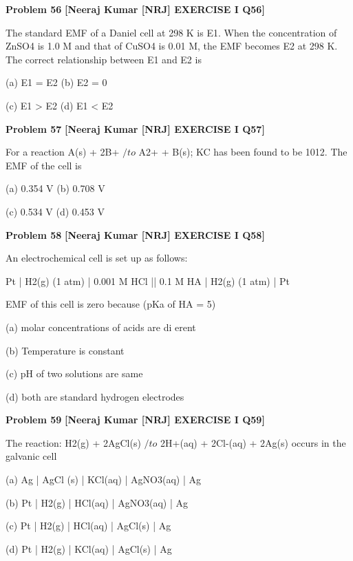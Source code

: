 \begin{problembox}
\textbf{Problem 56} \hfill \textbf{[Neeraj Kumar [NRJ] EXERCISE I Q56]}
\label{q:ext-nrj_all_questions-56}

The standard EMF of a Daniel cell at 298 K is 
E1. When the concentration of ZnSO4 is 1.0 M 
and that of CuSO4 is 0.01 M, the EMF becomes 
E2 at 298 K. The correct relationship between E1 
and E2 is
 
 (a) E1 = E2 
(b) E2 = 0
 
 (c) E1 > E2 
(d) E1 < E2
\end{problembox}

\begin{problembox}
\textbf{Problem 57} \hfill \textbf{[Neeraj Kumar [NRJ] EXERCISE I Q57]}
\label{q:ext-nrj_all_questions-57}

For a reaction A(s) + 2B+ $/to$ A2+ + B(s); KC has 
been found to be 1012. The EMF of the cell is
 
 (a) 0.354 V 
(b) 0.708 V
 
 (c) 0.534 V 
(d) 0.453 V
\end{problembox}

\begin{problembox}
\textbf{Problem 58} \hfill \textbf{[Neeraj Kumar [NRJ] EXERCISE I Q58]}
\label{q:ext-nrj_all_questions-58}

An electrochemical cell is set up as  follows:
 
   Pt | H2(g) (1 atm) | 0.001 M HCl || 0.1 M HA | 
H2(g) (1 atm) | Pt
 
   EMF of this cell is zero because (pKa of HA = 5)
 
 (a)  molar concentrations of acids are di  erent
 
 (b) Temperature is constant
 
 (c) pH of two solutions are same
 
 (d)  both are standard hydrogen  electrodes
\end{problembox}

\begin{problembox}
\textbf{Problem 59} \hfill \textbf{[Neeraj Kumar [NRJ] EXERCISE I Q59]}
\label{q:ext-nrj_all_questions-59}

The reaction: H2(g) + 2AgCl(s) $/to$ 2H+(aq)  + 
2Cl-(aq) + 2Ag(s) occurs in the galvanic cell
 
 (a)  Ag | AgCl (s) | KCl(aq) | AgNO3(aq) | Ag
 
 (b) Pt | H2(g) | HCl(aq) | AgNO3(aq) | Ag
 
 (c) Pt | H2(g) | HCl(aq) | AgCl(s) | Ag
 
 (d) Pt | H2(g) | KCl(aq) | AgCl(s) | Ag
\end{problembox}

